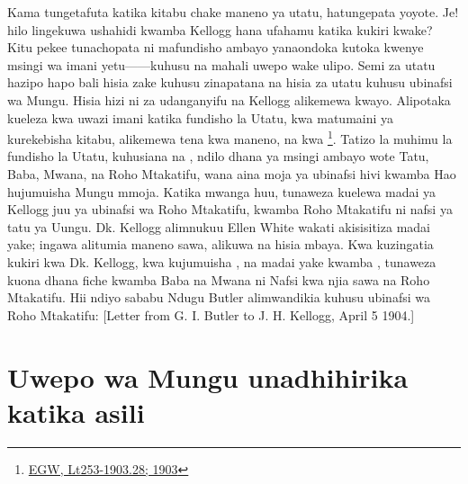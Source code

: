 Kama tungetafuta katika kitabu chake maneno ya utatu, hatungepata yoyote. Je! hilo lingekuwa ushahidi kwamba Kellogg hana ufahamu katika kukiri kwake? Kitu pekee tunachopata ni mafundisho ambayo yanaondoka kutoka kwenye msingi wa imani yetu——kuhusu  na mahali uwepo wake ulipo. Semi za utatu hazipo hapo bali hisia zake kuhusu  zinapatana na hisia za utatu kuhusu ubinafsi wa Mungu. Hisia hizi ni za udanganyifu na Kellogg alikemewa kwayo. Alipotaka kueleza kwa uwazi imani katika fundisho la Utatu, kwa matumaini ya kurekebisha kitabu, alikemewa tena kwa maneno,  na kwa \footnote{\href{https://egwwritings.org/?ref=en_Lt253-1903.28&para=9980.36}{EGW, Lt253-1903.28; 1903}}. Tatizo la muhimu la fundisho la Utatu, kuhusiana na , ndilo dhana ya msingi ambayo wote Tatu, Baba, Mwana, na Roho Mtakatifu, wana aina moja ya ubinafsi hivi kwamba Hao hujumuisha Mungu mmoja. Katika mwanga huu, tunaweza kuelewa madai ya Kellogg juu ya ubinafsi wa Roho Mtakatifu, kwamba Roho Mtakatifu ni nafsi ya tatu ya Uungu. Dk. Kellogg alimnukuu Ellen White wakati akisisitiza madai yake; ingawa alitumia maneno sawa, alikuwa na hisia mbaya. Kwa kuzingatia kukiri kwa Dk. Kellogg, kwa kujumuisha , na madai yake kwamba , tunaweza kuona dhana fiche kwamba Baba na Mwana ni Nafsi kwa njia sawa na Roho Mtakatifu. Hii ndiyo sababu Ndugu Butler alimwandikia kuhusu ubinafsi wa Roho Mtakatifu: [Letter from G. I. Butler to J. H. Kellogg, April 5 1904.]

\section*{Uwepo wa Mungu unadhihirika katika asili}

